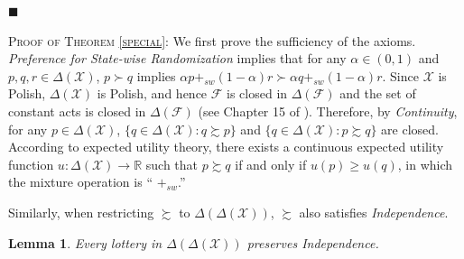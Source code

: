 \documentclass[12pt, notitlepage]{article}
\newtheorem{lemma}{Lemma}
\begin{document}
\begin{flushleft}
{$\blacksquare $\linebreak }
\end{flushleft}

{\textsc{Proof of Theorem \ref{special}}: We first prove the sufficiency of
the axioms. }\textit{Preference for State-wise Randomization} implies that
for any $\alpha \in (0,1)$ and $p,q,r\in \Delta (\mathcal{X})$, $p\succ q$
implies $\alpha p+_{sw}(1-\alpha )r\succ \alpha q+_{sw}(1-\alpha )r$. Since $%
\mathcal{X}$ is Polish, $\Delta (\mathcal{X})$ is Polish, and hence $%
\mathcal{F}$ is closed in $\Delta (\mathcal{F})$ and the set of constant
acts is closed in $\Delta (\mathcal{F})$ (see Chapter 15 of \cite%
{AliprantisBorder06}). Therefore, by \textit{Continuity}, for any $p\in
\Delta (\mathcal{X})$, $\{q\in \Delta (\mathcal{X}):q\succsim p\}$ and $%
\{q\in \Delta (\mathcal{X}):p\succsim q\}$ are closed. According to expected
utility theory, there exists a continuous expected utility function $%
u:\Delta (\mathcal{X})\rightarrow \mathbb{R}$ such that $p\succsim q$ if and
only if $u(p)\geq u(q)$, in which the mixture operation is \textquotedblleft 
$+_{sw}$.\textquotedblright

Similarly, when restricting $\succsim $ to $\Delta (\Delta (\mathcal{X}))$, $%
\succsim $ also satisfies \textit{Independence}.

\begin{lemma}
{\label{mixture}Every lottery in $\Delta (\Delta (\mathcal{X}))$ preserves
Independence.}
\end{lemma}
\end{document}
